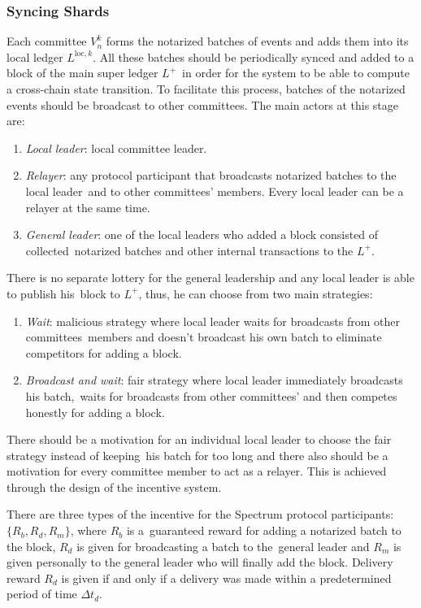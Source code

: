 \subsubsection{Syncing Shards}\label{subsubsec:syncing-shards}

Each committee $V_n^k$ forms the notarized batches of events and adds them into its local ledger $L^{\text{loc}, k}$.
All these batches should be periodically synced and added to a block of the main super ledger $L^+$\
in order for the system to be able to compute a cross-chain state transition.
To facilitate this process, batches of the notarized events should be broadcast to other committees.
The main actors at this stage are:
\begin{enumerate}
    \item \emph{Local leader}: local committee leader.
    \item \emph{Relayer}: any protocol participant that broadcasts notarized batches to the local leader\
    and to other committees' members.
    Every local leader can be a relayer at the same time.
    \item \emph{General leader}: one of the local leaders who added a block consisted of collected\
    notarized batches and other internal transactions to the $L^+$.
\end{enumerate}

There is no separate lottery for the general leadership and any local leader is able to publish his\
block to $L^+$, thus, he can choose from two main strategies:
\begin{enumerate}
    \item \emph{Wait}: malicious strategy where local leader waits for broadcasts from other committees\
    members and doesn't broadcast his own batch to eliminate competitors for adding a block.
    \item \emph{Broadcast and wait}: fair strategy where local leader immediately broadcasts his batch,\
    waits for broadcasts from other committees' and then competes honestly for adding a block.
\end{enumerate}
There should be a motivation for an individual local leader to choose the fair strategy instead of keeping\
his batch for too long and there also should be a motivation for every committee member to act as a relayer.
This is achieved through the design of the incentive system.

There are three types of the incentive for the Spectrum protocol participants: ${\{R_b, R_d, R_m\}}$, where $R_b$ is a\
guaranteed reward for adding a notarized batch to the block, $R_d$ is given for broadcasting a batch to the\
general leader and $R_m$ is given personally to the general leader who will finally add the block.
Delivery reward $R_d$ is given if and only if a delivery was made within a predetermined period of time $\Delta t_d$.

